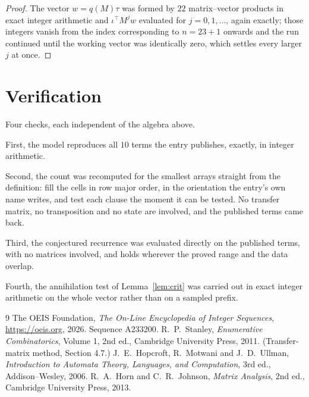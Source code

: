 \documentclass[11pt,a4paper]{article}
\theoremstyle{plain}
\theoremstyle{definition}
\begin{document}
\begin{proof}
The vector $w=q(M)\tau$ was formed by $22$ matrix--vector products in exact integer
arithmetic and $\iota^{\!\top}M^{j}w$ evaluated for $j=0,1,\dots$, again exactly; those
integers vanish from the index corresponding to $n=23+1$ onwards and the run continued
until the working vector was identically zero, which settles every larger $j$ at once.
\end{proof}

\section{Verification}

Four checks, each independent of the algebra above.

First, the model reproduces all $10$ terms the entry publishes, exactly, in integer
arithmetic.

Second, the count was recomputed for the smallest arrays straight from the definition: fill the
cells in row major order, in the orientation the entry's own name writes, and test each clause
the moment it can be tested. No transfer matrix, no transposition and no state are involved,
and the published terms came back.

Third, the conjectured recurrence was evaluated directly on the published terms, with no
matrices involved, and holds wherever the proved range and the data overlap.

Fourth, the annihilation test of Lemma~\ref{lem:crit} was carried out in exact integer
arithmetic on the whole vector rather than on a sampled prefix.

\begin{thebibliography}{9}
 The OEIS Foundation, \emph{The On-Line Encyclopedia of Integer
Sequences}, \url{https://oeis.org}, 2026. Sequence A233200.
 R.~P.~Stanley, \emph{Enumerative Combinatorics}, Volume 1, 2nd ed.,
Cambridge University Press, 2011. (Transfer-matrix method, Section 4.7.)
 J.~E.~Hopcroft, R.~Motwani and J.~D.~Ullman, \emph{Introduction to Automata
Theory, Languages, and Computation}, 3rd ed., Addison--Wesley, 2006.
 R.~A.~Horn and C.~R.~Johnson, \emph{Matrix Analysis}, 2nd ed., Cambridge
University Press, 2013.
\end{thebibliography}
\end{document}
